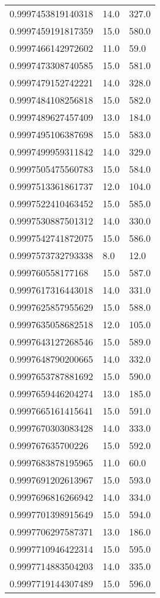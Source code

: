 \begin{center}
\begin{supertabular}[H]{p{0.30\textwidth}p{0.05\textwidth}p{0.05\textwidth}}
0.9997453819140318 & 14.0 & 327.0 \\ 
0.9997459191817359 & 15.0 & 580.0 \\ 
0.9997466142972602 & 11.0 & 59.0 \\ 
0.9997473308740585 & 15.0 & 581.0 \\ 
0.9997479152742221 & 14.0 & 328.0 \\ 
0.9997484108256818 & 15.0 & 582.0 \\ 
0.9997489627457409 & 13.0 & 184.0 \\ 
0.9997495106387698 & 15.0 & 583.0 \\ 
0.9997499959311842 & 14.0 & 329.0 \\ 
0.9997505475560783 & 15.0 & 584.0 \\ 
0.9997513361861737 & 12.0 & 104.0 \\ 
0.9997522410463452 & 15.0 & 585.0 \\ 
0.9997530887501312 & 14.0 & 330.0 \\ 
0.9997542741872075 & 15.0 & 586.0 \\ 
0.9997573732793338 & 8.0 & 12.0 \\ 
0.999760558177168 & 15.0 & 587.0 \\ 
0.9997617316443018 & 14.0 & 331.0 \\ 
0.9997625857955629 & 15.0 & 588.0 \\ 
0.9997635058682518 & 12.0 & 105.0 \\ 
0.9997643127268546 & 15.0 & 589.0 \\ 
0.9997648790200665 & 14.0 & 332.0 \\ 
0.9997653787881692 & 15.0 & 590.0 \\ 
0.9997659446204274 & 13.0 & 185.0 \\ 
0.9997665161415641 & 15.0 & 591.0 \\ 
0.9997670303083428 & 14.0 & 333.0 \\ 
0.999767635700226 & 15.0 & 592.0 \\ 
0.9997683878195965 & 11.0 & 60.0 \\ 
0.9997691202613967 & 15.0 & 593.0 \\ 
0.9997696816266942 & 14.0 & 334.0 \\ 
0.9997701398915649 & 15.0 & 594.0 \\ 
0.9997706297587371 & 13.0 & 186.0 \\ 
0.9997710946422314 & 15.0 & 595.0 \\ 
0.9997714883504203 & 14.0 & 335.0 \\ 
0.9997719144307489 & 15.0 & 596.0 \\ 

\end{supertabular}
\end{center}
